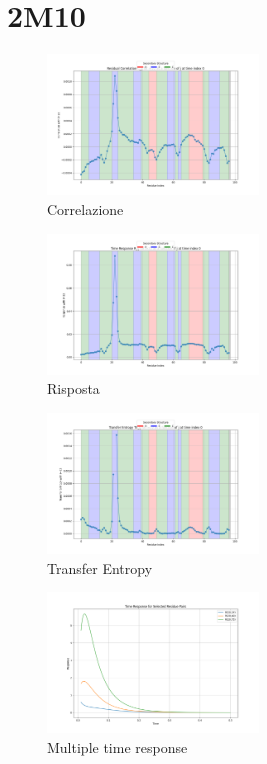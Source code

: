 \documentclass{article}
\begin{document}
\section{2M10}
\begin{figure}[H]
    \centering                            
    \includegraphics[width=0.5\textwidth]{"images/2m10Residual Correlation C_ij for i=22 as a function of j at time index 0.png"}
    \caption{Correlazione}
\end{figure}
\begin{figure}[H]
    \centering
    \includegraphics[width=0.5\textwidth]{"images/2m10Time Response R_ij for i=22 as a function of j at time index 0.png"}
    \caption{Risposta}
\end{figure}

\begin{figure}[H]
    \centering
    \includegraphics[width=0.5\textwidth]{"images/2m10Transfer Entropy TE_ij for i=22 as a function of j at time index 0.png"}
    \caption{Transfer Entropy}
\end{figure}
\begin{figure}[H]
    \centering
    \includegraphics[width=0.5\textwidth]{"images/2m10Multiple_time_resposne.png"}
    \caption{Multiple time response}
\end{figure}
\end{document}
